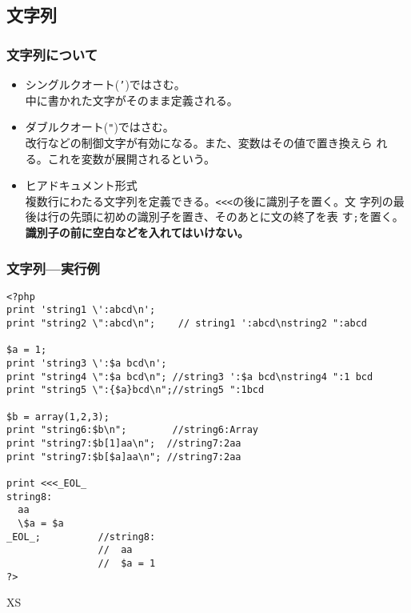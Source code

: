 \documentclass[dvipsk]{beamer}
\begin{document}
\subsection{文字列}
\begin{frame}[containsverbatim]
\frametitle{文字列について}
\begin{itemize}
 \item シングルクオート(\texttt{'})ではさむ。\\
   中に書かれた文字がそのまま定義される。
 \item ダブルクオート(\verb+"+)ではさむ。\\%
       改行などの制御文字が有効になる。また、変数はその値で置き換えら
       れる。これを変数が展開されるという。
 \item ヒアドキュメント形式\\
   複数行にわたる文字列を定義できる。\texttt{<<<}の後に識別子を置く。文
       字列の最後は行の先頭に初めの識別子を置き、そのあとに文の終了を表
       す\texttt{;}を置く。{\bfseries 識別子の前に空白などを入れてはいけない。}
\end{itemize}
\end{frame}
\begin{frame}[containsverbatim]
\frametitle{文字列---実行例}
{\scriptsize
\begin{verbatim}
<?php
print 'string1 \':abcd\n';
print "string2 \":abcd\n";    // string1 ':abcd\nstring2 ":abcd

$a = 1;
print 'string3 \':$a bcd\n';
print "string4 \":$a bcd\n"; //string3 ':$a bcd\nstring4 ":1 bcd
print "string5 \":{$a}bcd\n";//string5 ":1bcd

$b = array(1,2,3);
print "string6:$b\n";        //string6:Array
print "string7:$b[1]aa\n";  //string7:2aa
print "string7:$b[$a]aa\n"; //string7:2aa

print <<<_EOL_
string8:
  aa
  \$a = $a
_EOL_;          //string8:
                //  aa
                //  $a = 1
?>
\end{verbatim}
}XS
\end{frame}
\end{document}
